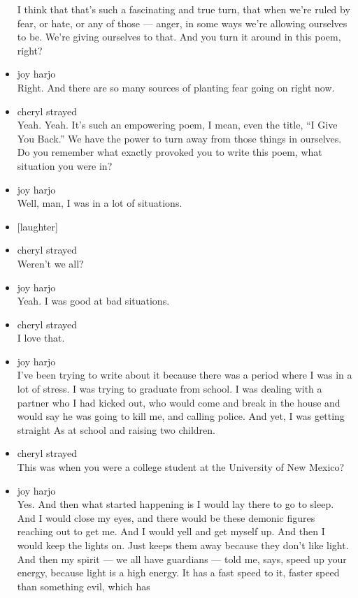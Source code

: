 \begin{itemize}
  I think that that's such a fascinating and true turn, that when we're
  ruled by fear, or hate, or any of those --- anger, in some ways we're
  allowing ourselves to be. We're giving ourselves to that. And you turn
  it around in this poem, right?
\item
  joy harjo\\
  Right. And there are so many sources of planting fear going on right
  now.
\item
  cheryl strayed\\
  Yeah. Yeah. It's such an empowering poem, I mean, even the title, ``I
  Give You Back.'' We have the power to turn away from those things in
  ourselves. Do you remember what exactly provoked you to write this
  poem, what situation you were in?
\item
  joy harjo\\
  Well, man, I was in a lot of situations.
\item
  {[}laughter{]}
\item
  cheryl strayed\\
  Weren't we all?
\item
  joy harjo\\
  Yeah. I was good at bad situations.
\item
  cheryl strayed\\
  I love that.
\item
  joy harjo\\
  I've been trying to write about it because there was a period where I
  was in a lot of stress. I was trying to graduate from school. I was
  dealing with a partner who I had kicked out, who would come and break
  in the house and would say he was going to kill me, and calling
  police. And yet, I was getting straight As at school and raising two
  children.
\item
  cheryl strayed\\
  This was when you were a college student at the University of New
  Mexico?
\item
  joy harjo\\
  Yes. And then what started happening is I would lay there to go to
  sleep. And I would close my eyes, and there would be these demonic
  figures reaching out to get me. And I would yell and get myself up.
  And then I would keep the lights on. Just keeps them away because they
  don't like light. And then my spirit --- we all have guardians ---
  told me, says, speed up your energy, because light is a high energy.
  It has a fast speed to it, faster speed than something evil, which has

\end{itemize}
